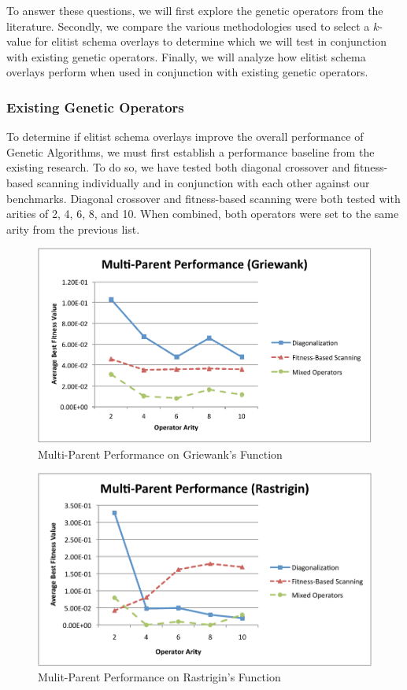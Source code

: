 To answer these questions, we will first explore the genetic operators from the literature. Secondly, we compare the various methodologies used to select a $k$-value for elitist schema overlays to determine which we will test in conjunction with existing genetic operators. Finally, we will analyze how elitist schema overlays perform when used in conjunction with existing genetic operators.

\subsubsection*{Existing Genetic Operators}
To determine if elitist schema overlays improve the overall performance of Genetic Algorithms, we must first establish a performance baseline from the existing research. To do so, we have tested both diagonal crossover and fitness-based scanning individually and in conjunction with each other against our benchmarks. Diagonal crossover and fitness-based scanning were both tested with arities of 2, 4, 6, 8, and 10. When combined, both operators were set to the same arity from the previous list. 

\begin{figure}[htbp!]
\centering
\includegraphics[scale=0.70]{charts/MP_Griewank.pdf}
\caption{Multi-Parent Performance on Griewank's Function}
\label{fig:mp_griewank}
\end{figure}

\begin{figure}[htbp!]
\centering
\includegraphics[scale=0.70]{charts/MP_Rastrigin.pdf}
\caption{Mulit-Parent Performance on Rastrigin's Function}
\label{fig:mp_rastrigin}
\end{figure}

